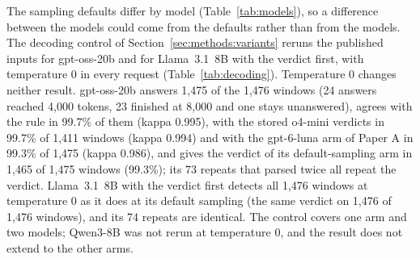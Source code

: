 The sampling defaults differ by model (Table~\ref{tab:models}), so a difference between the models could come from the defaults rather than from the models. The decoding control of Section~\ref{sec:methods:variants} reruns the published inputs for gpt-oss-20b and for Llama~3.1~8B with the verdict first, with temperature 0 in every request (Table~\ref{tab:decoding}). Temperature 0 changes neither result. gpt-oss-20b answers 1{,}475 of the 1{,}476 windows (24 answers reached 4{,}000 tokens, 23 finished at 8{,}000 and one stays unanswered), agrees with the rule in 99.7\% of them (kappa 0.995), with the stored o4-mini verdicts in 99.7\% of 1{,}411 windows (kappa 0.994) and with the gpt-6-luna arm of Paper A in 99.3\% of 1{,}475 (kappa 0.986), and gives the verdict of its default-sampling arm in 1{,}465 of 1{,}475 windows (99.3\%); its 73 repeats that parsed twice all repeat the verdict. Llama~3.1~8B with the verdict first detects all 1{,}476 windows at temperature 0 as it does at its default sampling (the same verdict on 1{,}476 of 1{,}476 windows), and its 74 repeats are identical. The control covers one arm and two models; Qwen3-8B was not rerun at temperature 0, and the result does not extend to the other arms.

